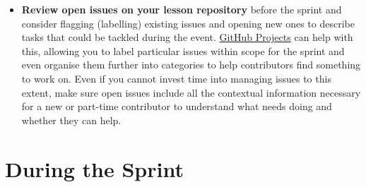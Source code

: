 \documentclass[
]{book}
\providecommand{\tightlist}{%
  \setlength{\itemsep}{0pt}\setlength{\parskip}{0pt}}
\begin{document}
\begin{itemize}
\tightlist
\item
  \textbf{Review open issues on your lesson repository} before the sprint
  and consider flagging (labelling) existing issues and opening new ones to describe tasks
  that could be tackled during the event.
  \href{https://docs.github.com/en/free-pro-team@latest/github/managing-your-work-on-github/about-project-boards}{GitHub Projects}
  can help with this,
  allowing you to label particular issues within scope for the sprint
  and even organise them further into categories to help contributors find something to work on.
  Even if you cannot invest time into managing issues to this extent,
  make sure open issues include all the contextual information necessary
  for a new or part-time contributor to understand what needs doing
  and whether they can help.
\end{itemize}

\hypertarget{during-the-sprint}{%
\section{During the Sprint}\label{during-the-sprint}}
\end{document}
